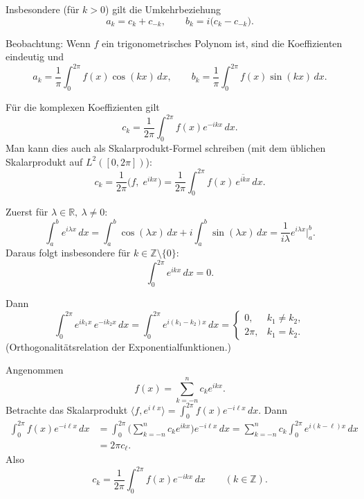 \begin{beispielbox}
    Insbesondere (für $k>0$) gilt die Umkehrbeziehung
    $$
    a_k = c_k + c_{-k},\qquad b_k = i\bigl(c_k - c_{-k}\bigr).
    $$

    Beobachtung: Wenn $f$ ein trigonometrisches Polynom ist, sind die Koeffizienten eindeutig und
    $$
    a_k=\frac{1}{\pi}\int_{0}^{2\pi} f(x)\cos(kx)\,dx,\qquad
    b_k=\frac{1}{\pi}\int_{0}^{2\pi} f(x)\sin(kx)\,dx.
    $$

    Für die komplexen Koeffizienten gilt
    $$
    c_k=\frac{1}{2\pi}\int_{0}^{2\pi} f(x)e^{-ikx}\,dx.
    $$
    Man kann dies auch als Skalarprodukt-Formel schreiben (mit dem üblichen Skalarprodukt auf $L^2([0,2\pi])$):
    $$
    c_k=\frac{1}{2\pi}\bigl(f,\;e^{ikx}\bigr)=\frac{1}{2\pi}\int_{0}^{2\pi} f(x)\,\overline{e^{ikx}}\,dx.
    $$

    \begin{beweisbox}
        Zuerst für $\lambda\in\mathbb{R},\ \lambda\neq0$:
        $$
        \int_a^b e^{i\lambda x}\,dx
        =\int_a^b \cos(\lambda x)\,dx + i\int_a^b \sin(\lambda x)\,dx
        =\frac{1}{i\lambda}e^{i\lambda x}\Big|_a^b.
        $$
        Daraus folgt insbesondere für $k\in\mathbb{Z}\setminus\{0\}$:
        $$
        \int_0^{2\pi} e^{ikx}\,dx = 0.
        $$

        Dann
        $$
        \int_0^{2\pi} e^{ik_1 x}\,e^{-ik_2 x}\,dx
        =\int_0^{2\pi} e^{i(k_1-k_2)x}\,dx
        =\begin{cases}
        0, & k_1\neq k_2,\\[4pt]
        2\pi, & k_1=k_2.
        \end{cases}
        $$
        (Orthogonalitätsrelation der Exponentialfunktionen.)

        Angenommen
        $$
        f(x)=\sum_{k=-n}^{n} c_k e^{ikx}.
        $$
        Betrachte das Skalarprodukt $\langle f,e^{i\ell x}\rangle=\int_0^{2\pi} f(x)e^{-i\ell x}\,dx$. Dann
        \begin{align*}
        \int_0^{2\pi} f(x)e^{-i\ell x}\,dx
        &=\int_0^{2\pi}\Big(\sum_{k=-n}^{n} c_k e^{ikx}\Big)e^{-i\ell x}\,dx
        =\sum_{k=-n}^{n} c_k \int_0^{2\pi} e^{i(k-\ell)x}\,dx\\
        &=2\pi c_\ell.
        \end{align*}
        Also
        $$
        c_k=\frac{1}{2\pi}\int_0^{2\pi} f(x)e^{-ikx}\,dx\qquad (k\in\mathbb{Z}).
        $$


\end{beweisbox}
\end{beispielbox}

